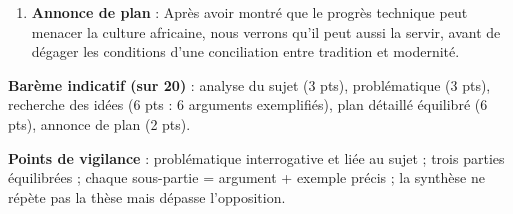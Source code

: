 \documentclass[11pt]{article}
\begin{document}
\begin{corrige}
\begin{enumerate}
\textbf{II. Pourtant, le progrès technique peut servir la culture.}
\begin{itemize}
\item 1. Il facilite la vie et renforce les solidarités (exemples : portable et commerce, Mobile Money, machines agricoles).
\item 2. Il diffuse et préserve le patrimoine (exemples : CRTV et danses traditionnelles, contes oraux numérisés, photo de Sidi dans le magazine).
\end{itemize}

\textbf{III. Tradition et modernité peuvent se concilier.}
\begin{itemize}
\item 1. La technique n'est qu'un outil : tout dépend de l'usage qu'on en fait (exemple : Baroka lui-même sait user du moderne pour défendre son village).
\item 2. Une modernité enracinée dans la culture est possible (exemple : les jeunes créateurs camerounais qui mêlent makossa et musiques urbaines).
\end{itemize}
\item \textbf{Annonce de plan} : \og Après avoir montré que le progrès technique peut menacer la culture africaine, nous verrons qu'il peut aussi la servir, avant de dégager les conditions d'une conciliation entre tradition et modernité. \fg
\end{enumerate}
\textbf{Barème indicatif (sur 20)} : analyse du sujet (3 pts), problématique (3 pts), recherche des idées (6 pts : 6 arguments exemplifiés), plan détaillé équilibré (6 pts), annonce de plan (2 pts).

\textbf{Points de vigilance} : problématique interrogative et liée au sujet ; trois parties équilibrées ; chaque sous-partie = argument + exemple précis ; la synthèse ne répète pas la thèse mais dépasse l'opposition.
\end{corrige}
\end{document}
